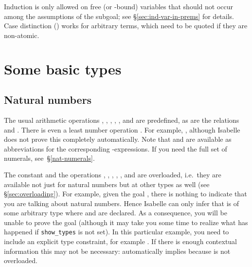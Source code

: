 \begin{exercise}\label{ex:Tree}
%
\end{exercise}



\begin{warn}
  Induction is only allowed on free (or \isasymAnd-bound) variables that
  should not occur among the assumptions of the subgoal; see
  \S\ref{sec:ind-var-in-prems} for details. Case distinction
  () works for arbitrary terms, which need to be
  quoted if they are non-atomic.
\end{warn}




\section{Some basic types}


\subsection{Natural numbers}
\label{sec:nat}




The usual arithmetic operations ,
, ,
, ,  and
 are predefined, as are the relations
 and
. There is even a least number operation
. For example, , although
Isabelle does not prove this completely automatically. Note that  and
 are available as abbreviations for the corresponding
-expressions. If you need the full set of numerals,
see~\S\ref{nat-numerals}.

\begin{warn}
  The constant  and the operations
  , ,
  , , ,
   and
   are overloaded, i.e.\ they are available
  not just for natural numbers but at other types as well (see
  \S\ref{sec:overloading}). For example, given the goal , there
  is nothing to indicate that you are talking about natural numbers.  Hence
  Isabelle can only infer that  is of some arbitrary type where
   and \isa{+} are declared. As a consequence, you will be unable to
  prove the goal (although it may take you some time to realize what has
  happened if \texttt{show_types} is not set).  In this particular example,
  you need to include an explicit type constraint, for example .  If there is enough contextual information this may not be
  necessary:  automatically implies  because
   is not overloaded.
\end{warn}

